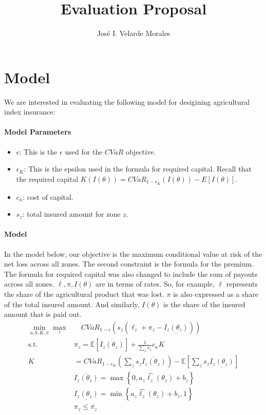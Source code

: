 \documentclass[11pt]{article}
\title{Evaluation Proposal}
\author{José I. Velarde Morales}
\begin{document}
\maketitle

\section{Model}
We are interested in evaluating the following model for desigining agricultural index insurance:

  \paragraph*{Model Parameters}
  \begin{itemize}
      \item $\epsilon$: This is the $\epsilon$ used for the $CVaR$ objective. 
      \item $\epsilon_K$: This is the epsilon used in the formula for required capital. Recall that the required capital $K(I(\theta)) = CVaR_{1-\epsilon_K}(I(\theta)) - E[I(\theta)]$. 
      \item $c_{\kappa}$: cost of capital. 
      \item $s_z$: total insured amount for zone $z$.
  \end{itemize}

  \paragraph*{Model}
  In the model below, our objective is the maximum conditional value at risk of the net loss across all zones. The second constraint is the formula for the premium. The formula for required capital was also changed to include the sum of payouts across all zones. $\ell, \pi, I(\theta)$ are in terms of rates. So, for example, $\ell$ represents the share of the agricultural product that was lost. $\pi$ is also expressed as a share of the total insured amount. And similarly, $I(\theta)$ is the share of the insured amount that is paid out.
  \begin{align}
    \min_{a,b,K,\pi} \max_z &\quad CVaR_{1-\epsilon}\left (s_z \left (\ell_z  + \pi_z - \underline{I_z(\theta_z)}\right ) \right )\\
    \text{s.t.   } & \pi_z  = \mathbb{E}\left [ \overline{I_z(\theta_z)} \right ] + \frac{1}{\sum_z s_z} c_{\kappa} K \\
    K &= CVaR_{1-\epsilon_K} \left( \sum_z s_z\overline{I_z(\theta_z)} \right ) - \mathbb{E}\left [ \sum_z s_z\underline{I_z(\theta_z)} \right ]\\
    &\overline{I_z(\theta_z)} = \max \left \{0,a_z\hat{\ell_z}(\theta_z) + b_z \right \}\\
    &\underline{I_z(\theta_z)} = \min \left \{a_z\hat{\ell_z}(\theta_z)+b_z,1 \right \}\\
    &\pi_z \leq \overline{\pi_z}
  \end{align}
\end{document}
